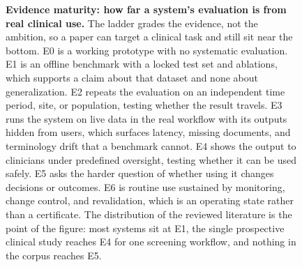 \begin{figure}[!t]
\centering
{}
\caption{\textbf{Evidence maturity: how far a system's evaluation is from real clinical use.} The ladder grades the evidence, not the ambition, so a paper can target a clinical task and still sit near the bottom. E0 is a working prototype with no systematic evaluation. E1 is an offline benchmark with a locked test set and ablations, which supports a claim about that dataset and none about generalization. E2 repeats the evaluation on an independent time period, site, or population, testing whether the result travels. E3 runs the system on live data in the real workflow with its outputs hidden from users, which surfaces latency, missing documents, and terminology drift that a benchmark cannot. E4 shows the output to clinicians under predefined oversight, testing whether it can be used safely. E5 asks the harder question of whether using it changes decisions or outcomes. E6 is routine use sustained by monitoring, change control, and revalidation, which is an operating state rather than a certificate. The distribution of the reviewed literature is the point of the figure: most systems sit at E1, the single prospective clinical study reaches E4 for one screening workflow, and nothing in the corpus reaches E5.}
\label{fig:maturity}
\end{figure}

